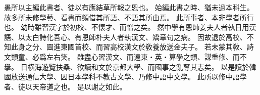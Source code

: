 愚所以主編此書者、徒以有應結草所報之恩也。
始編此書之時、猶未過本科生。
故多所未修學藝、看書而頻借其所語、不語其所由焉。
此所事者、本非學者所行也。
幼時雖習漢字於初校、不懷才、而憎之矣。
然中學有恩師姜夫人者執日用漢語、以太白詩化吾心、有恩師朴夫人者執漢文、矯章句之病。
因故退於高校、不知此身之分、圖進東國首校、而習高校漢文於敎養放送金夫子。
若未蒙其敎、詩文類童、必爲左右笑。
雖盡心習漢文、而遠東・英・算學之類、謀重修、而不擧。
日横海遊覽扶桑、欲讀和文於京都大學、而國事之亂奪其志矣。
以是讀於韓國放送通信大學、因日本學科不教古文學、乃修中語中文學。
此所以修中語學者、徒以天帝道之也。
是以謝之如此。
